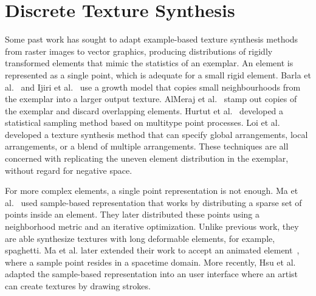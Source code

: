 \section{Discrete Texture Synthesis}
Some past work has sought to adapt example-based texture synthesis methods
from raster images to vector graphics, producing distributions of
rigidly transformed elements that mimic the statistics of an exemplar.
An element is represented as a single point, which is adequate for a small rigid element.
Barla et al.~\cite{Barla2006} and Ijiri et al.~\cite{Ijiri2008} use a growth model that copies small neighbourhoods
from the exemplar into a larger output texture.  AlMeraj et al.~\cite{AlMeraj2013}
stamp out copies of the exemplar and discard overlapping elements.
Hurtut et al.~\cite{Hurtut2009} developed a statistical sampling method based
on multitype point processes.  
Loi et al.~\cite{Loi2017} developed a texture synthesis method that
can specify global arrangements, local arrangements, or a blend of multiple arrangements.
These techniques are all concerned with replicating
the uneven element distribution in the exemplar, without regard for negative space.

For more complex elements, a single point representation is not enough.
Ma et al.~\cite{Ma2011} used sample-based representation 
that works by distributing a sparse set of points inside an element.
They later distributed these points using a neighborhood metric and an iterative optimization.
Unlike previous work, they are able synthesize textures with long deformable elements, for example, spaghetti.
Ma et al. later extended their work to accept an animated element~\cite{Ma2013}, where
a sample point resides in a spacetime domain.
More recently, Hsu et al.~\cite{Hsu2020} adapted the sample-based representation into an user interface
where an artist can create textures by drawing strokes. %


